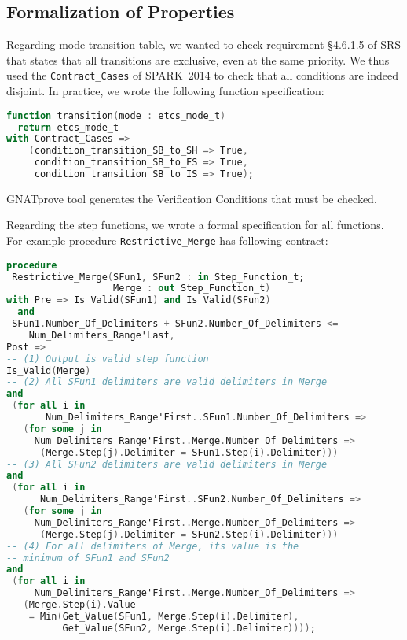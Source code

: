 \documentclass[10pt,a4paper,twocolumn]{article}
\newcommand{\gnatprove}{GNATprove\xspace}
\newcommand{\newspark}{SPARK~2014\xspace}
\newcommand{\SPARK}[1]{\lstinline[language=Ada,basicstyle={\footnotesize
      \sffamily},framesep=0pt]$#1$}
\begin{document}
\subsection{Formalization of Properties}

Regarding mode transition table, we wanted to check requirement
§4.6.1.5 of SRS that states that all transitions are exclusive, even
at the same priority. We thus used the \SPARK{Contract_Cases} of
\newspark to check that all conditions are indeed disjoint. In
practice, we wrote the following function specification:

\begin{lstlisting}[language=Ada]
function transition(mode : etcs_mode_t)
  return etcs_mode_t
with Contract_Cases =>
    (condition_transition_SB_to_SH => True,
     condition_transition_SB_to_FS => True,
     condition_transition_SB_to_IS => True);
\end{lstlisting}

\gnatprove tool generates the Verification Conditions that must be
checked.

Regarding the step functions, we wrote a formal specification for all
functions. For example procedure \SPARK{Restrictive_Merge} has
following contract:

\begin{lstlisting}[language=Ada]
procedure
 Restrictive_Merge(SFun1, SFun2 : in Step_Function_t;
                   Merge : out Step_Function_t)
with Pre => Is_Valid(SFun1) and Is_Valid(SFun2)
  and
 SFun1.Number_Of_Delimiters + SFun2.Number_Of_Delimiters <=
    Num_Delimiters_Range'Last,
Post =>
-- (1) Output is valid step function
Is_Valid(Merge)
-- (2) All SFun1 delimiters are valid delimiters in Merge
and
 (for all i in
       Num_Delimiters_Range'First..SFun1.Number_Of_Delimiters =>
   (for some j in
     Num_Delimiters_Range'First..Merge.Number_Of_Delimiters =>
      (Merge.Step(j).Delimiter = SFun1.Step(i).Delimiter)))
-- (3) All SFun2 delimiters are valid delimiters in Merge
and
 (for all i in
      Num_Delimiters_Range'First..SFun2.Number_Of_Delimiters =>
   (for some j in
     Num_Delimiters_Range'First..Merge.Number_Of_Delimiters =>
      (Merge.Step(j).Delimiter = SFun2.Step(i).Delimiter)))
-- (4) For all delimiters of Merge, its value is the
-- minimum of SFun1 and SFun2
and
 (for all i in
     Num_Delimiters_Range'First..Merge.Number_Of_Delimiters =>
   (Merge.Step(i).Value
    = Min(Get_Value(SFun1, Merge.Step(i).Delimiter),
          Get_Value(SFun2, Merge.Step(i).Delimiter))));
\end{lstlisting}
\end{document}
